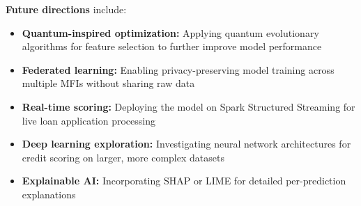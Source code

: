 \documentclass[runningheads]{llncs}
\begin{document}
\textbf{Future directions} include:
\begin{itemize}
    \item \textbf{Quantum-inspired optimization:} Applying quantum evolutionary algorithms for feature selection to further improve model performance~\cite{li2020quantum, orus2019quantum}
    \item \textbf{Federated learning:} Enabling privacy-preserving model training across multiple MFIs without sharing raw data~\cite{yang2019federated}
    \item \textbf{Real-time scoring:} Deploying the model on Spark Structured Streaming for live loan application processing
    \item \textbf{Deep learning exploration:} Investigating neural network architectures for credit scoring on larger, more complex datasets~\cite{bussmann2021deep}
    \item \textbf{Explainable AI:} Incorporating SHAP or LIME for detailed per-prediction explanations~\cite{bucker2022xai}
\end{itemize}

\end{document}
